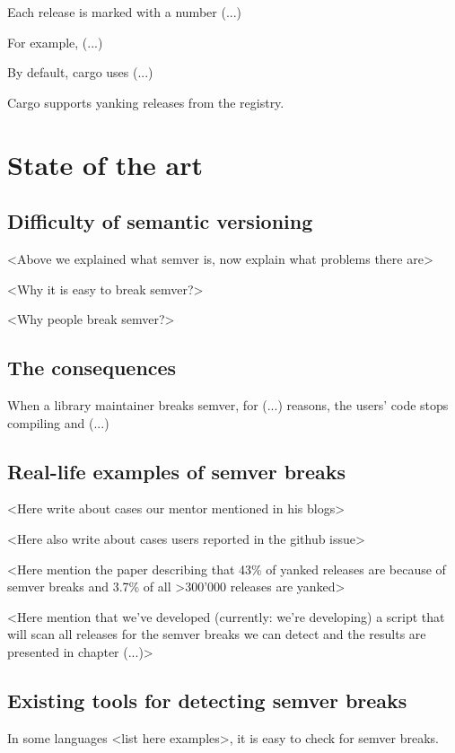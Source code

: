 \documentclass[licencjacka,en]{pracamgr}
\begin{document}
Each release is marked with a number (...)

For example, (...)

By default, cargo uses (...)

Cargo supports yanking releases from the registry.



\chapter{State of the art}\label{r:stateoftheart}

\section{Difficulty of semantic versioning}

<Above we explained what semver is, now explain what problems there are>

<Why it is easy to break semver?>

<Why people break semver?>

\section{The consequences}

When a library maintainer breaks semver, for (...) reasons, the users' code stops compiling and (...)


\section{Real-life examples of semver breaks}

<Here write about cases our mentor mentioned in his blogs>

<Here also write about cases users reported in the github issue>

<Here mention the paper describing that 43\% of yanked releases
are because of semver breaks and 3.7\% of all >300'000 releases are yanked>

<Here mention that we've developed (currently: we're developing)
a script that will scan all releases for the semver breaks
we can detect and the results are presented in chapter (...)>


\section{Existing tools for detecting semver breaks}

In some languages <list here examples>, it is easy to check for semver breaks.
\end{document}
